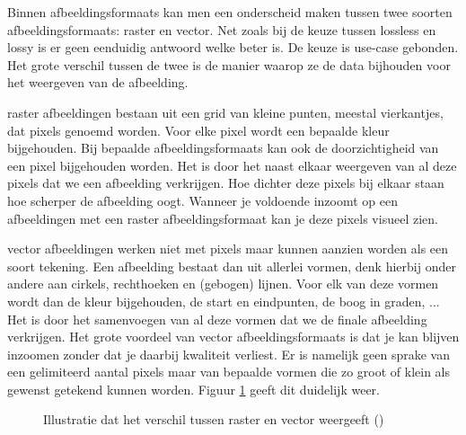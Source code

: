Binnen \glspl{afbeeldingsformaat} kan men een onderscheid maken tussen twee soorten \glspl{afbeeldingsformaat}: \gls{raster} en \gls{vector}. Net zoals bij de keuze tussen \gls{lossless} en \gls{lossy} is er geen eenduidig antwoord welke beter is. De keuze is \gls{use-case} gebonden. Het grote verschil tussen de twee is de manier waarop ze de data bijhouden voor het weergeven van de afbeelding.

\Gls{raster} afbeeldingen bestaan uit een grid van kleine punten, meestal vierkantjes, dat pixels genoemd worden. Voor elke pixel wordt een bepaalde kleur bijgehouden. Bij bepaalde \glspl{afbeeldingsformaat} kan ook de doorzichtigheid van een pixel bijgehouden worden. Het is door het naast elkaar weergeven van al deze pixels dat we een afbeelding verkrijgen. Hoe dichter deze pixels bij elkaar staan hoe scherper de afbeelding oogt. Wanneer je voldoende inzoomt op een afbeeldingen met een \gls{raster} \gls{afbeeldingsformaat} kan je deze pixels visueel zien.

\Gls{vector} afbeeldingen werken niet met pixels maar kunnen aanzien worden als een soort tekening. Een afbeelding bestaat dan uit allerlei vormen, denk hierbij onder andere aan cirkels, rechthoeken en (gebogen) lijnen. Voor elk van deze vormen wordt dan de kleur bijgehouden, de start en eindpunten, de boog in graden, ... Het is door het samenvoegen van al deze vormen dat we de finale afbeelding verkrijgen. Het grote voordeel van vector \glspl{afbeeldingsformaat} is dat je kan blijven inzoomen zonder dat je daarbij kwaliteit verliest. Er is namelijk geen sprake van een gelimiteerd aantal pixels maar van bepaalde vormen die zo groot of klein als gewenst getekend kunnen worden. Figuur \ref{fig:raster-vs-vector} geeft dit duidelijk weer.

\begin{figure}
	\centering
	\caption{Illustratie dat het verschil tussen \gls{raster} en \gls{vector} weergeeft (\cite{rastervsvector})}
	\label{fig:raster-vs-vector}
\end{figure}

